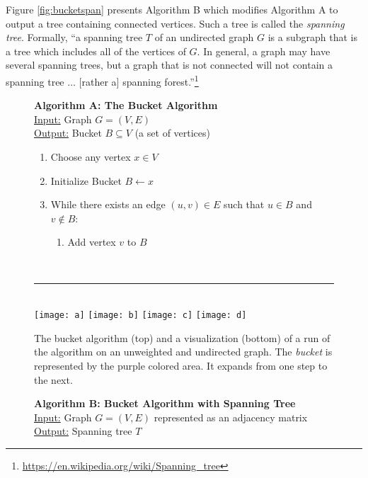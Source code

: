 \documentclass[a4paper]{exam}
\begin{document}
\begin{questions}
  Figure \ref{fig:bucketspan} presents Algorithm B which modifies Algorithm A to output a tree containing connected vertices. Such a tree is called the \textit{spanning tree}. Formally, ``a spanning tree $T$ of an undirected graph $G$ is a subgraph that is a tree which includes all of the vertices of $G$. In general, a graph may have several spanning trees, but a graph that is not connected will not contain a spanning tree $\ldots$ [rather a] spanning forest.''\footnote{\url{https://en.wikipedia.org/wiki/Spanning_tree}}
  
  \begin{figure}
    \begin{center}
    \begin{minipage}{.8\textwidth}
    \textbf{Algorithm A: The Bucket Algorithm}\\
    \underline{Input:} Graph $G = (V, E)$\\
    \underline{Output:} Bucket $B \subseteq V$ (a set of vertices)

    \begin{enumerate}
    \item Choose any vertex $x \in V$
    \item Initialize Bucket $B \leftarrow x$
    \item While there exists an edge $(u, v) \in E$ such that $u \in B$ and $v \not\in B$:
      \begin{enumerate}
      \item Add vertex $v$ to $B$
      \end{enumerate}
    \end{enumerate}
  \end{minipage}\\[5pt]

    \rule{300pt}{.5pt}\\
    \texttt{[image: a]}
    \texttt{[image: b]}
    \texttt{[image: c]}
    \texttt{[image: d]}      
  \end{center}
  \caption{The bucket algorithm (top) and a visualization (bottom) of a run of the algorithm on an unweighted and undirected graph. The \textit{bucket} is represented by the purple colored area. It expands from one step to the next.}
    \label{fig:bucket}
  \end{figure}
  \begin{figure}
    \begin{center}
    \begin{minipage}{.8\textwidth}
\textbf{Algorithm B: Bucket Algorithm with Spanning Tree}\\
\underline{Input:} Graph $G = (V, E)$ represented as an adjacency matrix\\
\underline{Output:} Spanning tree $T$


\end{minipage}
\end{center}
\end{figure}
\end{questions}
\end{document}
